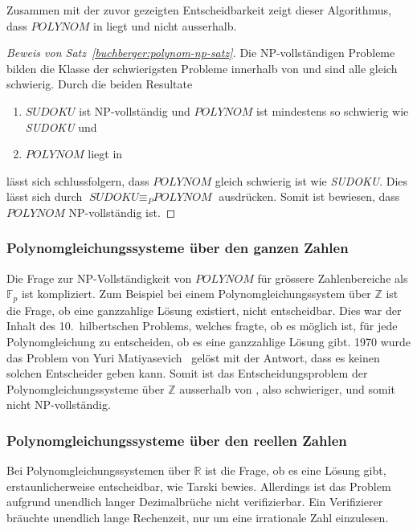 Zusammen mit der zuvor gezeigten Entscheidbarkeit zeigt dieser Algorithmus, dass $\textit{POLYNOM}$ in  liegt und nicht ausserhalb.

\begin{proof}[Beweis von Satz~\ref{buchberger:polynom-np-satz}]
Die NP-vollständigen Probleme bilden die Klasse der schwierigsten Probleme innerhalb von  und sind alle gleich schwierig.
Durch die beiden Resultate
\begin{enumerate}
  \item
  $\textit{SUDOKU}$ ist NP-vollständig und $\textit{POLYNOM}$ ist mindestens so schwierig wie {\it SU\-DO\-KU} und
  \item
  $\textit{POLYNOM}$ liegt in 
\end{enumerate}
lässt sich schlussfolgern, dass $\textit{POLYNOM}$ gleich schwierig ist wie {\it SUDOKU}.
Dies lässt sich durch
$\textit{SUDOKU} \equiv_{P} \textit{POLYNOM}$
ausdrücken.
%
Somit ist bewiesen, dass $\textit{POLYNOM}$ NP-vollständig ist.
\end{proof}

\subsubsection{Polynomgleichungssysteme über den ganzen Zahlen}
Die Frage zur NP-Vollständigkeit von $\textit{POLYNOM}$ für grössere Zahlenbereiche als $\mathbb{F}_p$ ist kompliziert.
Zum Beispiel bei einem Polynomgleichungssystem über $\mathbb{Z}$ ist die Frage, ob eine ganzzahlige Lösung existiert, nicht entscheidbar.
Dies war der Inhalt des 10.~hilbertschen Problems, welches fragte, ob es möglich ist, für jede Polynomgleichung zu entscheiden, ob es eine ganzzahlige Lösung gibt.
%
%
%
1970 wurde das Problem von Yuri Matiyasevich~\cite{buchberger:matiyasevich} gelöst mit der Antwort, dass es keinen solchen Entscheider geben kann.
%
Somit ist das Entscheidungsproblem der Polynomgleichungssysteme über $\mathbb{Z}$ ausserhalb von , also schwieriger, und somit nicht NP-vollständig.

\subsubsection{Polynomgleichungssysteme über den reellen Zahlen}
Bei Polynomgleichungssystemen über $\mathbb{R}$ ist die Frage, ob es eine Lösung gibt, erstaunlicherweise entscheidbar, wie Tarski bewies.
Allerdings ist das Problem aufgrund unendlich langer Dezimalbrüche nicht verifizierbar.
Ein Verifizierer bräuchte unendlich lange Rechenzeit, nur um eine irrationale Zahl einzulesen.


